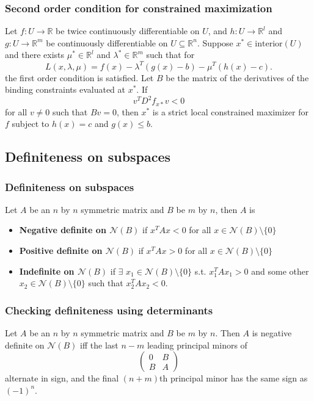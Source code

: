 \documentclass[compress]{beamer}
\def\R{\mathbb{R}}
\renewcommand{\to}{{\rightarrow}}
\begin{document}
\begin{frame}[shrink]\frametitle{Second order condition for constrained maximization}
\begin{theorem}
  Let $f:U \to \R$ be twice continuously
  differentiable on $U$, and $h:U \to \R^l$ and $g: U \to \R^m$ be
  continuously differentiable on $U \subseteq \R^n$. Suppose $x^* \in    
  \mathrm{interior}(U)$ and there exists
  $\mu^* \in \R^l$ and $\lambda^* \in \R^m$ such that for 
  \[ L(x,\lambda,\mu) = f(x) - \lambda^T (g(x) - b) - \mu^T(h(x) - c). \]
  the first order condition is satisfied. 
  Let $B$ be the matrix of the derivatives of the binding constraints
  evaluated at $x^*$.
  If 
  \[ v^T D^2 f_{x*} v < 0 \]
  for all $v \neq 0$ such that $B v = 0$, then $x^*$ is a strict
  local constrained maximizer for $f$ subject to $h(x) = c$ and $g(x)
  \leq b$. 
\end{theorem}
\end{frame}

\subsection{Definiteness on subspaces}
\begin{frame}\frametitle{Definiteness on subspaces}
  \begin{definition}
    Let $A$ be an $n$ by $n$ symmetric matrix and $B$ be $m$ by $n$, then $A$ is 
    \begin{itemize}
    \item \textbf{Negative definite on $\mathcal{N}(B)$} if $x^T A x <
      0$ for all $x \in \mathcal{N}(B) \setminus \{0\}$ 
    \item \textbf{Positive definite on $\mathcal{N}(B)$} if $x^T A x >
      0$ for all $x \in \mathcal{N}(B) \setminus \{0\}$ 
    \item \textbf{Indefinite on $\mathcal{N}(B)$} if $\exists$ $x_1 \in
      \mathcal{N}(B) \setminus \{0\}$  
      s.t. $x_1^T A x_1 > 0$ and 
      some other $x_2 \in \mathcal{N}(B) \setminus \{0\}$  such that
      $x_2^T A x_2 < 0$. 
    \end{itemize}  
  \end{definition}
\end{frame}

\begin{frame}\frametitle{Checking definiteness using determinants}
  \begin{theorem}\label{thm:nds}
    Let $A$ be an $n$ by $n$ symmetric matrix and $B$ be $m$ by
    $n$. Then $A$ is negative definite on $\mathcal{N}(B)$ iff the
    last $n-m$ leading principal minors of
    \[
    \begin{pmatrix} 0 & B \\
      B & A 
    \end{pmatrix}
    \]
    alternate in sign, and the final $(n+m)$th principal minor has the
    same sign as $(-1)^n$.
  \end{theorem}
\end{frame}
\end{document}
